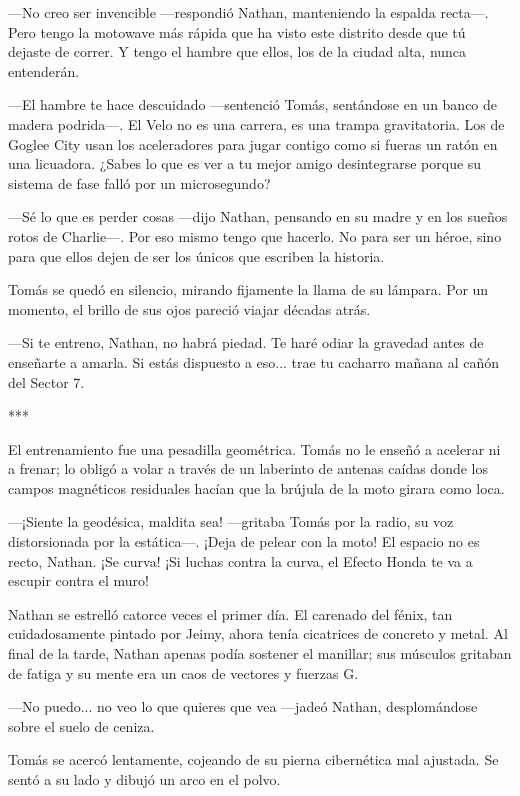 \documentclass[11pt,twoside]{book}
\begin{document}
---No creo ser invencible ---respondió Nathan, manteniendo la espalda recta---. Pero tengo la motowave más rápida que ha visto este distrito desde que tú dejaste de correr. Y tengo el hambre que ellos, los de la ciudad alta, nunca entenderán.

---El hambre te hace descuidado ---sentenció Tomás, sentándose en un banco de madera podrida---. El Velo no es una carrera, es una trampa gravitatoria. Los de Goglee City usan los aceleradores para jugar contigo como si fueras un ratón en una licuadora. ¿Sabes lo que es ver a tu mejor amigo desintegrarse porque su sistema de fase falló por un microsegundo?

---Sé lo que es perder cosas ---dijo Nathan, pensando en su madre y en los sueños rotos de Charlie---. Por eso mismo tengo que hacerlo. No para ser un héroe, sino para que ellos dejen de ser los únicos que escriben la historia.

Tomás se quedó en silencio, mirando fijamente la llama de su lámpara. Por un momento, el brillo de sus ojos pareció viajar décadas atrás.

---Si te entreno, Nathan, no habrá piedad. Te haré odiar la gravedad antes de enseñarte a amarla. Si estás dispuesto a eso... trae tu cacharro mañana al cañón del Sector 7.

\bigskip
\begin{center}***\end{center}
\bigskip

El entrenamiento fue una pesadilla geométrica. Tomás no le enseñó a acelerar ni a frenar; lo obligó a volar a través de un laberinto de antenas caídas donde los campos magnéticos residuales hacían que la brújula de la moto girara como loca.

---¡Siente la geodésica, maldita sea! ---gritaba Tomás por la radio, su voz distorsionada por la estática---. ¡Deja de pelear con la moto! El espacio no es recto, Nathan. ¡Se curva! ¡Si luchas contra la curva, el Efecto Honda te va a escupir contra el muro!

Nathan se estrelló catorce veces el primer día. El carenado del fénix, tan cuidadosamente pintado por Jeimy, ahora tenía cicatrices de concreto y metal. Al final de la tarde, Nathan apenas podía sostener el manillar; sus músculos gritaban de fatiga y su mente era un caos de vectores y fuerzas G.

---No puedo... no veo lo que quieres que vea ---jadeó Nathan, desplomándose sobre el suelo de ceniza.

Tomás se acercó lentamente, cojeando de su pierna cibernética mal ajustada. Se sentó a su lado y dibujó un arco en el polvo.
\end{document}

